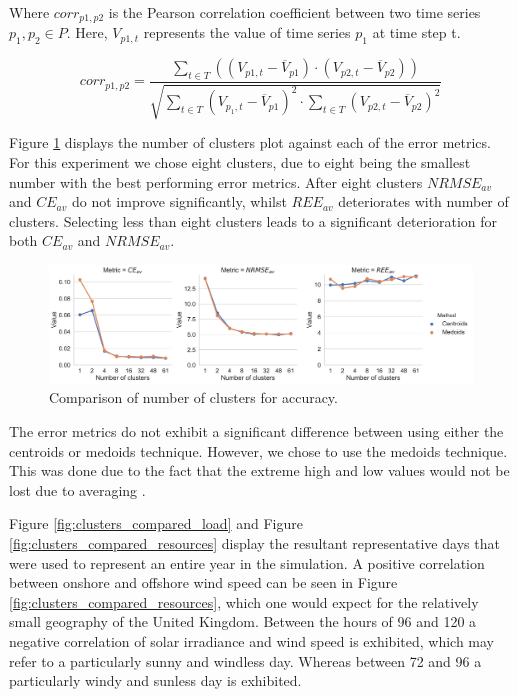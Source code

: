 \documentclass[final,3p,times,twocolumn,numbers]{elsarticle}
\begin{document}
Where $corr_{p1,p2}$ is the Pearson correlation coefficient between two time series $p_1,p_2\in P$. Here, $V_{p1,t}$ represents the value of time series $p_1$ at time step t. 

\begin{equation}
	corr_{p1,p2}=\frac
	{\sum\limits_{t\in T}\left(\left(V_{p1,t}-\overline{V}_{p1}\right)\cdot\left(V_{p2,t}-\overline{V}_{p2}\right)\right)}
	{\sqrt{
	\sum\limits_{t\in T} \left(V_{p_1,t}-\overline{V}_{p1}\right)^2\cdot\sum\limits_{t\in T}\left(V_{p2,t}-\overline{V}_{p2}\right)^2
	}}
\end{equation}

Figure \ref{fig:clusters_compared} displays the number of clusters plot against each of the error metrics. For this experiment we chose eight clusters, due to eight being the smallest number with the best performing error metrics. After eight clusters $NRMSE_{av}$ and $CE_{av}$ do not improve significantly, whilst $REE_{av}$ deteriorates with number of clusters. Selecting less than eight clusters leads to a significant deterioration for both $CE_{av}$ and $NRMSE_{av}$.

\begin{figure}
\centering
\includegraphics[width=\textwidth]{figures/methods_and_materials/clusters_compared.pdf}
\caption{Comparison of number of clusters for accuracy.}
\label{fig:clusters_compared}
\end{figure}

The error metrics do not exhibit a significant difference between using either the centroids or medoids technique. However, we chose to use the medoids technique. This was done due to the fact that the extreme high and low values would not be lost due to averaging \cite{Hilbers2019}.

Figure \ref{fig:clusters_compared_load} and Figure \ref{fig:clusters_compared_resources} display the resultant representative days that were used to represent an entire year in the simulation. A positive correlation between onshore and offshore wind speed can be seen in Figure \ref{fig:clusters_compared_resources}, which one would expect for the relatively small geography of the United Kingdom. Between the hours of 96 and 120 a negative correlation of solar irradiance and wind speed is exhibited, which may refer to a particularly sunny and windless day. Whereas between 72 and 96 a particularly windy and sunless day is exhibited.
\end{document}
